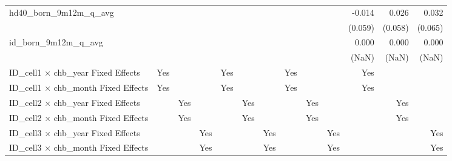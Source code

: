 \begin{tabular}{lrrrrrrrrrrrr}
hd40\_born\_9m12m\_q\_avg                   &              &              &              &              &              &              &              &              &              &       -0.014 &        0.026 &        0.032 \\ 
                                            &              &              &              &              &              &              &              &              &              &      (0.059) &      (0.058) &      (0.065) \\ 
id\_born\_9m12m\_q\_avg                     &              &              &              &              &              &              &              &              &              &        0.000 &        0.000 &        0.000 \\ 
                                            &              &              &              &              &              &              &              &              &              &        (NaN) &        (NaN) &        (NaN) \\ 
\midrule
ID\_cell1 $\times$ chb\_year Fixed Effects  &          Yes &              &              &          Yes &              &              &          Yes &              &              &          Yes &              &              \\ 
ID\_cell1 $\times$ chb\_month Fixed Effects &          Yes &              &              &          Yes &              &              &          Yes &              &              &          Yes &              &              \\ 
ID\_cell2 $\times$ chb\_year Fixed Effects  &              &          Yes &              &              &          Yes &              &              &          Yes &              &              &          Yes &              \\ 
ID\_cell2 $\times$ chb\_month Fixed Effects &              &          Yes &              &              &          Yes &              &              &          Yes &              &              &          Yes &              \\ 
ID\_cell3 $\times$ chb\_year Fixed Effects  &              &              &          Yes &              &              &          Yes &              &              &          Yes &              &              &          Yes \\ 
ID\_cell3 $\times$ chb\_month Fixed Effects &              &              &          Yes &              &              &          Yes &              &              &          Yes &              &              &          Yes \\ 

\end{tabular}
